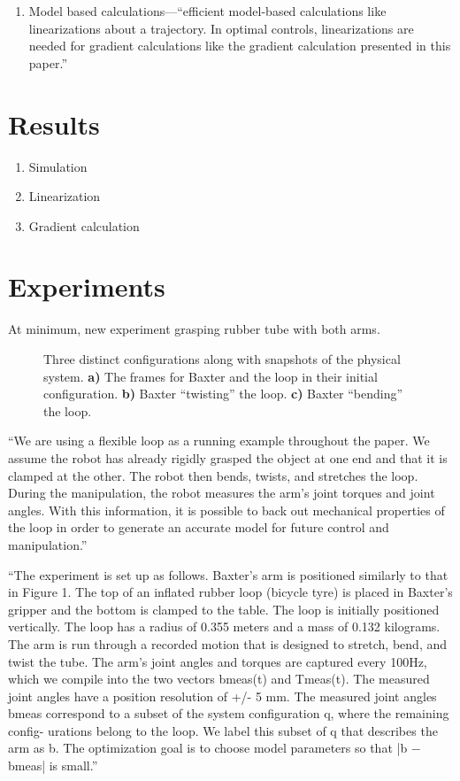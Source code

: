 \documentclass[runningheads,a4paper]{llncs}
\begin{document}
\begin{enumerate}
\begin{enumerate}
  \item Model based calculations---``efficient model-based calculations like linearizations about a trajectory.   In optimal controls, linearizations are needed for gradient calculations like the gradient calculation presented in this paper.''
\end{enumerate}
\end{enumerate}


\newpage
\section{Results}

\begin{enumerate}
\item Simulation
\item Linearization
\item Gradient calculation
\end{enumerate}


\newpage
\section{Experiments}

At minimum, new experiment grasping rubber tube with both arms.

\begin{figure}
\centering
\def\svgwidth{.97\textwidth}

\caption{Three distinct configurations along with snapshots of the physical system.  \textbf{a)} The frames for Baxter and the loop in their initial configuration. \textbf{b)} Baxter ``twisting'' the loop. \textbf{c)} Baxter ``bending'' the loop.}
\label{fig-3bloops}
\end{figure}

``We are using a flexible loop as a running example throughout the paper.  We assume the robot has already rigidly grasped the object at one end and that it is clamped at the other. The robot then bends, twists, and stretches the loop.  During the manipulation, the robot measures the arm's joint torques and joint angles.  With this information, it is possible to back out mechanical properties of the loop in order to generate an accurate model for future control and manipulation.''

``The experiment is set up as follows. Baxter’s arm is positioned similarly to that in Figure 1. The top of an inflated rubber loop (bicycle tyre) is placed in Baxter’s gripper and the bottom is clamped to the table. The loop is initially positioned vertically. The loop has a radius of 0.355 meters and a mass of 0.132 kilograms. The arm is run through a recorded motion that is designed to stretch, bend, and twist the tube. The arm’s joint angles and torques are captured every 100Hz, which we compile into the two vectors bmeas(t) and Tmeas(t). The measured joint angles have a position resolution of +/- 5 mm.
The measured joint angles bmeas correspond to a subset of the system configuration q, where the remaining config- urations belong to the loop. We label this subset of q that describes the arm as b. The optimization goal is to choose model parameters so that |b − bmeas| is small.''
\end{document}
